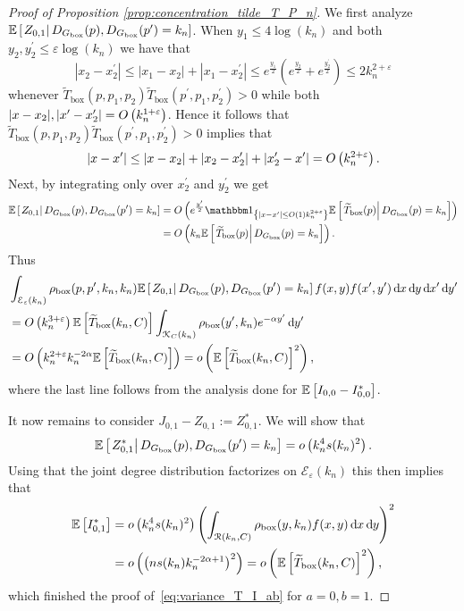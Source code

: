 \begin{proof}[Proof of Proposition \ref{prop:concentration_tilde_T_P_n}]
We first analyze $\mathbb{E}\left[\left.Z_{0,1}\right|D_{G_{\mathrm{box}}}(p), D_{G_{\mathrm{box}}}(p^\prime) = k_n\right]$. When $y_1 \le 4\log(k_n)$ and both $y_2, y_2^\prime \le \varepsilon \log(k_n)$ we have that
\[
	|x_2 - x_2^\prime| \le |x_1 - x_2| + |x_1 - x_2^\prime| \le e^{\frac{y_1}{2}}\left(e^{\frac{y_2}{2}} + e^{\frac{y_2^\prime}{2}}\right) \le 2k_n^{2+\varepsilon}
\]
whenever $\widetilde{T}_{\text{box}}(p,p_1,p_2) \widetilde{T}_{\text{box}}(p^\prime,p_1,p_2^\prime) > 0$ while both $|x - x_2|, |x^\prime - x_2^\prime| = O\left(k_n^{1 + \varepsilon}\right)$. Hence it follows that $\widetilde{T}_{\text{box}}(p,p_1,p_2) \widetilde{T}_{\text{box}}(p^\prime,p_1,p_2^\prime) > 0$ implies that
\[
	|x - x^\prime| \le |x - x_2| + |x_2 - x_2^\prime| + |x_2^\prime - x^\prime| = O\left(k_n^{2 + \varepsilon}\right).
\]
Next, by integrating only over $x_2^\prime$ and $y_2^\prime $ we get
\begin{align*}
	\CExp{Z_{0,1}}{\Dbox(p), \Dbox(p^\prime) = k_n} &=
	\bigO{e^{\frac{y^\prime}{2}}\ind{|x-x^\prime|\le \bigO{1}k_n^{2 + \varepsilon}} 
		\CExp{\widetilde{T}_{\text{box}}(p)}{\Dbox(p) =k_n}}\\
	&= \bigO{k_n \CExp{\widetilde{T}_{\text{box}}(p)}{\Dbox(p) =k_n}}.
\end{align*}
Thus
\begin{align*}
	&\int_{\mathcal{E}_\varepsilon(k_n)} \rho_{\text{box}}(p,p^\prime,k_n,k_n)
		\mathbb{E}\left[\left.Z_{0,1}\right|D_{G_{\mathrm{box}}}(p), D_{G_{\mathrm{box}}}(p^\prime) = k_n\right] f(x,y) f(x^\prime,y^\prime) \operatorname{\mathrm{d}\hspace{-2pt}} x \operatorname{\mathrm{d}\hspace{-2pt}} y \operatorname{\mathrm{d}\hspace{-2pt}} x^\prime \operatorname{\mathrm{d}\hspace{-2pt}} y^\prime\\
	&= O\left(k_n^{3+\varepsilon}\right) \mathbb{E}\left[\widetilde{T}_{\text{box}}(k_n,C)\right] 
		\int_{{\mathcal K}_{C}(k_n)}\rho_{\text{box}}(y^\prime,k_n) e^{-\alpha y^\prime} \operatorname{\mathrm{d}\hspace{-2pt}} y^\prime\\
	&= O\left(k_n^{2+\varepsilon} k_n^{-2\alpha} \mathbb{E}\left[\widetilde{T}_{\text{box}}(k_n,C)\right] \right) 
		= o\left(\mathbb{E}\left[\widetilde{T}_{\text{box}}(k_n,C)\right]^2\right), 
\end{align*}
where the last line follows from the analysis done for $\mathbb{E}\left[I_{0,0}-I_{0,0}^\ast\right]$.

It now remains to consider $J_{0,1} - Z_{0,1} := Z_{0,1}^\ast$. We will show that 
\begin{equation}\label{eq:expectation_J01}
	\mathbb{E}\left[\left.Z_{0,1}^\ast\right|D_{G_{\mathrm{box}}}(p), D_{G_{\mathrm{box}}}(p^\prime) = k_n\right] = o\left(k_n^4 s(k_n)^2\right).
\end{equation} 
Using that the joint degree distribution factorizes on $\mathcal{E}_\varepsilon(k_n)$ this then implies that
\begin{align*}
	\mathbb{E}\left[I_{0,1}^\ast\right]
	&= o\left(k_n^4 s(k_n)^2\right) \left(\int_{{\mathcal R}(k_n,C)} \rho_{\text{box}}(y,k_n) f(x,y) \operatorname{\mathrm{d}\hspace{-2pt}} x \operatorname{\mathrm{d}\hspace{-2pt}} y \right)^2\\ 
	&= o\left(\left(n s(k_n) k_n^{-2\alpha + 1}\right)^2\right) = o\left(\mathbb{E}\left[\widetilde{T}_{\text{box}}(k_n,C)\right]^2\right),
\end{align*}
which finished the proof of~\eqref{eq:variance_T_I_ab} for $a = 0, b = 1$.


\end{proof}
